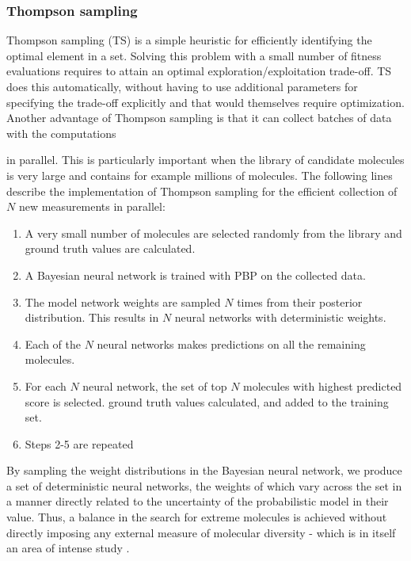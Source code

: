 \subsubsection{Thompson sampling}

Thompson sampling (TS) \cite{Thompson_1933} is a simple heuristic for efficiently identifying the optimal element in a set. Solving this problem with a small number of fitness evaluations requires to attain an optimal exploration/exploitation trade-off. TS does this automatically, without having to use additional parameters for specifying the trade-off explicitly and that would themselves require optimization. Another advantage of Thompson sampling is that it can collect batches of data with the computations

in parallel. This is 
particularly important when the library of candidate molecules is very large and contains for example millions of molecules.
The following lines describe the implementation of Thompson sampling for the efficient collection of $N$ new measurements in parallel:
\begin{enumerate}
\item A very small number of molecules are selected randomly from the library and ground truth values are calculated.
\item A Bayesian neural network is trained with PBP on the collected data.
\item The model network weights are sampled $N$ times from their posterior distribution. This results in $N$ neural networks with deterministic weights.
\item Each of the $N$ neural networks makes predictions on all the remaining molecules.
\item For each $N$ neural network, the set of top $N$ molecules with highest predicted score is selected.
ground truth values calculated, and added to the training set.
\item Steps 2-5 are repeated
\end{enumerate}
By sampling the weight distributions in the Bayesian neural network, we produce a set of deterministic neural networks, the weights of which vary across the set in a manner directly related to the uncertainty of the probabilistic model in their value.  Thus, a balance in the search for extreme molecules is achieved without directly imposing any external measure of molecular diversity - which is in itself an area of intense study \cite{Maldonado_2006}.